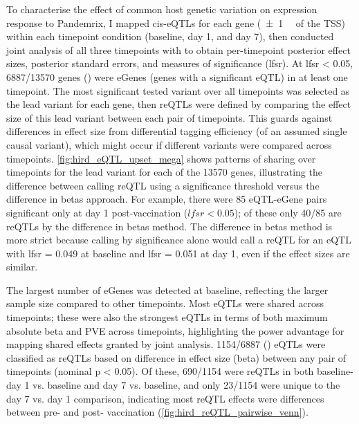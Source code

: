 To characterise the effect of common host genetic variation on expression response to Pandemrix,
I mapped cis-\glspl{eQTL} for each gene (\SI{\pm1}{\mega\bp} of the \gls{TSS}) within each timepoint condition (baseline, day 1, and day 7),
then conducted joint analysis of all three timepoints with  \autocite{urbut2018FlexibleStatisticalMethods} to obtain per-timepoint posterior effect sizes, posterior standard errors, and measures of significance (\gls{lfsr}).
At \gls{lfsr} < 0.05, \num{6887/13570} genes () were eGenes (genes with a significant \gls{eQTL}) in at least one timepoint.
The most significant tested variant over all timepoints was selected as the lead variant for each gene,
then \glspl{reQTL} were defined by comparing the effect size of this lead variant between each pair of timepoints.
This guards against differences in effect size from differential tagging efficiency (of an assumed single causal variant), which might occur if different variants were compared across timepoints.
\cref{fig:hird_eQTL_upset_mega} shows patterns of sharing over timepoints for the lead variant for each of the \num{13570} genes,
illustrating the difference between calling \gls{reQTL} using a significance threshold versus the difference in betas approach.
For example, there were 85 \gls{eQTL}-eGene pairs significant only at day 1 post-vaccination ($lfsr < 0.05$); of these only \num{40/85} are \glspl{reQTL} by the difference in betas method.
The difference in betas method is more strict because calling by significance alone would call a \gls{reQTL} for an \gls{eQTL} with lfsr = 0.049 at baseline and lfsr = 0.051 at day 1, even if the effect sizes are similar.

The largest number of eGenes was detected at baseline, reflecting the larger sample size compared to other timepoints.
Most \glspl{eQTL} were shared across timepoints; 
these were also the strongest \glspl{eQTL} in terms of both maximum absolute beta and \gls{PVE} across timepoints, highlighting the power advantage for mapping shared effects granted by joint analysis.
\num{1154/6887} () \glspl{eQTL} were classified as \glspl{reQTL} based on difference in effect size (beta) between any pair of timepoints (nominal p < 0.05).
Of these, 
\num{690/1154} were \glspl{reQTL} in both baseline- day 1 vs. baseline and day 7 vs. baseline, 
and only \num{23/1154} were unique to the day 7 vs. day 1 comparison, 
indicating most \gls{reQTL} effects were differences between pre- and post- vaccination (\cref{fig:hird_reQTL_pairwise_venn}).

